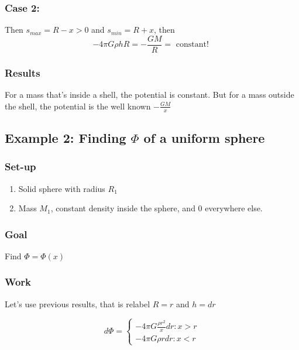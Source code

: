 \documentclass{article}
\newtheorem{one minute paper}[theorem]{One Minute Paper}
\begin{document}
\begin{enumerate}
    \subsubsection*{Case 2:}
    Then $s_{max} = R - x > 0$ and $s_{min} = R + x$, then 
    \begin{equation}
        -4\pi G\rho hR = -\frac{GM}{R} = \text{ constant! }
    \end{equation}
    \subsubsection*{Results}
    For a mass that's inside a shell, the potential is constant. But for a mass outside the shell, the potential is the well known $-\frac{GM}{x}$
\end{enumerate}

\subsection*{Example 2: Finding $\Phi$ of a uniform sphere}

\subsubsection*{Set-up}
\begin{enumerate}
    \item Solid sphere with radius $R_1$
    \item Mass $M_1$, constant density inside the sphere, and 0 everywhere else. 
\end{enumerate}

\subsubsection*{Goal}
Find $\Phi = \Phi(x)$

\subsubsection*{Work}

Let's use previous results, that is relabel $R = r$ and $h = dr$

\begin{equation}
    d\Phi = \begin{cases}
        -4\pi G\frac{\rho r^2}{x}dr : x > r \\
        -4\pi G\rho r dr : x < r 
    \end{cases}
\end{equation}
\end{document}
